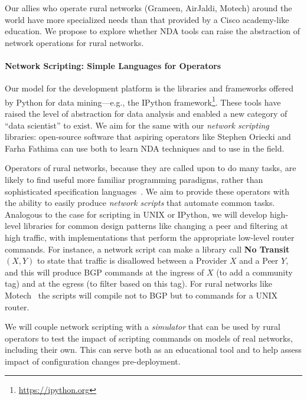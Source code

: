 Our allies who operate rural networks (Grameen, AirJaldi, Motech) around the world have more specialized needs than that provided by a Cisco academy-like education. We propose to explore whether NDA tools can raise
the abstraction of network operations for rural networks.



\paragraph*{Network Scripting: Simple Languages for Operators}
%
Our model for the development platform is the libraries and frameworks offered by Python for data mining---e.g., the IPython framework\footnote{\url{https://ipython.org}}. These tools have raised the level of abstraction for data analysis and enabled a new category of ``data scientist'' to exist. We aim for the same with our \emph{network scripting} libraries: open-source software that aspiring operators like Stephen Oriecki and Farha Fathima can use both to learn NDA techniques and to use in the field.

Operators of rural networks, because they are called upon to do many tasks, are likely to find useful more familiar programming paradigms, rather than sophisticated specification languages~\cite{netkat,propane}.  We aim to provide these operators with the ability to easily produce \emph{network scripts} that automate common tasks. Analogous to the case for scripting in UNIX or IPython, we will develop high-level libraries for common design patterns like changing a peer and filtering at high traffic, with implementations that perform the appropriate low-level router commands.  For instance, a network script can make a library call {\bf No Transit $(X, Y)$} to state that traffic is disallowed between a Provider $X$ and a Peer $Y$, and this will produce BGP commands at the ingress of $X$ (to add a community tag) and at the egress (to filter based on this tag).  For rural networks like Motech~\cite{barath} the scripts will compile not to BGP but to commands for a UNIX router.

We will couple network scripting with a \emph{simulator} that can be used by rural operators to test the impact of scripting commands on models of real networks, including their own. This can serve both as an educational tool and to help assess impact of configuration changes pre-deployment.

